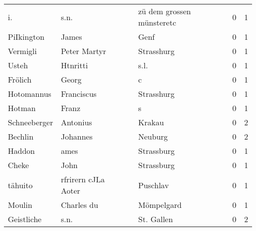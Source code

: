 \begin{center}
\begin{tiny}
\begin{longtabu}{llllrr}
                       i. &                               s.n. &             &                   zü dem grossen münsteretc &          0 &         1 \\
               PiIkington &                              James &             &                                        Genf &          0 &         1 \\
                 Vermigli &                       Peter Martyr &             &                                  Strasshurg &          0 &         1 \\
                    Usteh &                           Htnritti &             &                                        s.l. &          0 &         1 \\
                  Frölich &                              Georg &             &                                           c &          0 &         1 \\
               Hotomannus &                         Franciscus &             &                                  Strasshurg &          0 &         1 \\
                   Hotman &                              Franz &             &                                           s &          0 &         1 \\
             Schneeberger &                           Antonius &             &                                      Krakau &          0 &         2 \\
                  Bechlin &                           Johannes &             &                                     Neuburg &          0 &         2 \\
                   Haddon &                               ames &             &                                  Strassburg &          0 &         1 \\
                    Cheke &                               John &             &                                  Strassburg &          0 &         1 \\
                  tähuito &                rfrirern cJLa Aoter &             &                                    Puschlav &          0 &         1 \\
                   Moulin &                         Charles du &             &                                  Mömpelgard &          0 &         1 \\
               Geistliche &                               s.n. &             &                                  St. Gallen &          0 &         2 \\

\end{longtabu}
\end{tiny}
\end{center}
